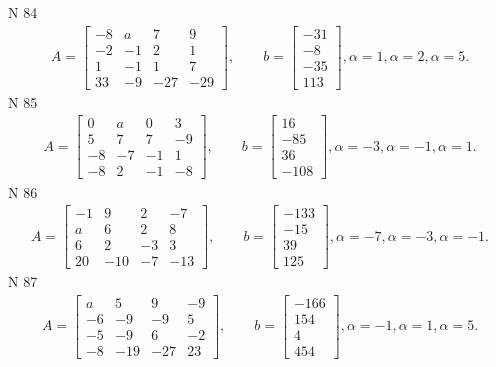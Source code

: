 \documentclass[11pt]{report}
\begin{document}
N 84
\begin{align*}
 A = \left[\begin{matrix}-8 & a & 7 & 9\\-2 & -1 & 2 & 1\\1 & -1 & 1 & 7\\33 & -9 & -27 & -29\end{matrix}\right],
    \qquad b = \left[\begin{matrix}-31\\-8\\-35\\113\end{matrix}\right], \alpha = 1, \alpha = 2, \alpha = 5. 
 \end{align*}
N 85
\begin{align*}
 A = \left[\begin{matrix}0 & a & 0 & 3\\5 & 7 & 7 & -9\\-8 & -7 & -1 & 1\\-8 & 2 & -1 & -8\end{matrix}\right],
    \qquad b = \left[\begin{matrix}16\\-85\\36\\-108\end{matrix}\right], \alpha = -3, \alpha = -1, \alpha = 1. 
 \end{align*}
N 86
\begin{align*}
 A = \left[\begin{matrix}-1 & 9 & 2 & -7\\a & 6 & 2 & 8\\6 & 2 & -3 & 3\\20 & -10 & -7 & -13\end{matrix}\right],
    \qquad b = \left[\begin{matrix}-133\\-15\\39\\125\end{matrix}\right], \alpha = -7, \alpha = -3, \alpha = -1. 
 \end{align*}
N 87
\begin{align*}
 A = \left[\begin{matrix}a & 5 & 9 & -9\\-6 & -9 & -9 & 5\\-5 & -9 & 6 & -2\\-8 & -19 & -27 & 23\end{matrix}\right],
    \qquad b = \left[\begin{matrix}-166\\154\\4\\454\end{matrix}\right], \alpha = -1, \alpha = 1, \alpha = 5. 
 \end{align*}
\end{document}
